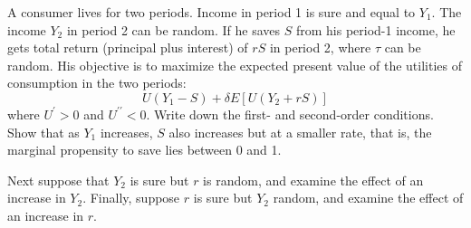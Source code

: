 A consumer lives for two periods. Income in period 1 is sure and equal to $Y_1$. The income $Y_2$ in period 2 can be random. If he saves $S$ from his period-1 income, he gets total return (principal plus interest) of $rS$ in period 2, where $\tau$ can be random. His objective is to maximize the expected present value of the utilities of consumption in the two periods:
\begin{equation*}
U(Y_1 - S) + \delta E[U(Y_2 + rS)]
\end{equation*}
where $U^\prime >0$ and $U^{\prime \prime} <0$. Write down the first- and second-order conditions. Show that as $Y_1$ increases, $S$ also increases but at a smaller rate, that is, the marginal propensity to save lies between 0 and 1.

Next suppose that $Y_2$ is sure but $r$ is random, and examine the effect of an increase in $Y_2$. Finally, suppose $r$ is sure but $Y_2$ random, and examine the effect of an increase in $r$.



